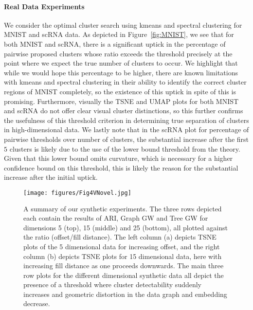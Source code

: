 \documentclass{article}
\theoremstyle{plain}
\theoremstyle{definition}
\theoremstyle{remark}
\begin{document}
\paragraph{Real Data Experiments}
We consider the optimal cluster search using kmeans and spectral clustering for MNIST and scRNA data. As depicted in Figure~\ref{fig:MNIST}, we see that for both MNIST and scRNA, there is a significant uptick in the percentage of pairwise proposed clusters whose ratio exceeds the threshold precisely at the point where we expect the true number of clusters to occur. We highlight that while we would hope this percentage to be higher, there are known limitations with kmeans and spectral clustering in their ability to identify the correct cluster regions of MNIST completely, so the existence of this uptick in spite of this is promising. Furthermore, visually the TSNE and UMAP plots for both MNIST and scRNA do not offer clear visual cluster distinctions, so this further confirms the usefulness of this threshold criterion in determining true separation of clusters in high-dimensional data. We lastly note that in the scRNA plot for percentage of pairwise thresholds over number of clusters, the substantial increase after the first $5$ clusters is likely due to the use of the lower bound threshold from the theory. Given that this lower bound omits curvature, which is necessary for a higher confidence bound on this threshold, this is likely the reason for the substantial increase after the initial uptick.


\begin{figure}[t]
\centering
\texttt{[image: figures/Fig4VNovel.jpg]}
\caption{A summary of our synthetic experiments. The three rows depicted each contain the results of ARI, Graph GW and Tree GW for dimensions 5 (top), 15 (middle) and 25 (bottom), all plotted against the ratio (offset/fill distance). The left column (a) depicts TSNE plots of the 5 dimensional data for increasing offset, and the right column (b) depicts TSNE plots for 15 dimensional data, here with increasing fill distance as one proceeds downwards. The main three row plots for the different dimensional synthetic data all depict the presence of a threshold where cluster detectability suddenly increases and geometric distortion in the data graph and embedding decrease.}
\label{fig:dim-aggregate}
\end{figure}
\end{document}
